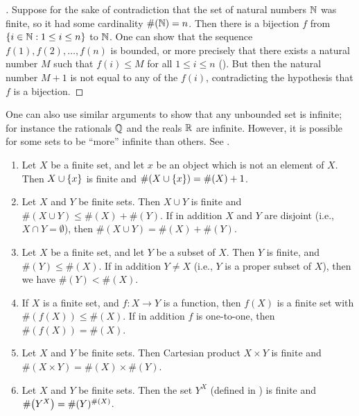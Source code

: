 \begin{proof}[]
  Suppose for the sake of contradiction that the set of natural numbers \(\mathbb{N}\) was finite, so it had some cardinality \(\#(\mathbb{N}) = n\).
  Then there is a bijection \(f\) from \(\left\lbrace i \in \mathbb{N} : 1 \leq i \leq n\right\rbrace\) to \(\mathbb{N}\).
  One can show that the sequence \(f(1), f(2), \dots, f(n)\) is bounded, or more precisely that there exists a natural number \(M\) such that \(f(i) \leq M\) for all \(1 \leq i \leq n\) ().
  But then the natural number \(M+1\) is not equal to any of the \(f(i)\), contradicting the hypothesis that \(f\) is a bijection.
\end{proof}

\begin{rmk}\label{i:3.6.13}
  One can also use similar arguments to show that any unbounded set is infinite;
  for instance the rationals \(\mathbb{Q}\) and the reals \(\mathbb{R}\) are infinite.
  However, it is possible for some sets to be ``more'' infinite than others.
  See .
\end{rmk}

\begin{prop}\label{i:3.6.14}
  \begin{enumerate}
    \item\label{i:3.6.14.a} Let \(X\) be a finite set, and let \(x\) be an object which is not an element of \(X\).
    Then \(X \cup \left\lbrace x\right\rbrace\) is finite and \(\#(X \cup \left\lbrace x\right\rbrace) = \#(X) + 1\).
    \item\label{i:3.6.14.b} Let \(X\) and \(Y\) be finite sets.
    Then \(X \cup Y\) is finite and \(\#(X \cup Y) \leq \#(X) + \#(Y)\).
    If in addition \(X\) and \(Y\) are disjoint (i.e., \(X \cap Y = \emptyset\)), then \(\#(X \cup Y) = \#(X) + \#(Y)\).
    \item\label{i:3.6.14.c} Let \(X\) be a finite set, and let \(Y\) be a subset of \(X\).
    Then \(Y\) is finite, and \(\#(Y) \leq \#(X)\).
    If in addition \(Y \neq X\) (i.e., \(Y\) is a proper subset of \(X\)), then we have \(\#(Y) < \#(X)\).
    \item\label{i:3.6.14.d} If \(X\) is a finite set, and \(f : X \to Y\) is a function, then \(f(X)\) is a finite set with \(\#(f(X)) \leq \#(X)\).
    If in addition \(f\) is one-to-one, then \(\#(f(X)) = \#(X)\).
    \item\label{i:3.6.14.e} Let \(X\) and \(Y\) be finite sets.
    Then Cartesian product \(X \times Y\) is finite and \(\#(X \times Y) = \#(X) \times \#(Y)\).
    \item\label{i:3.6.14.f} Let \(X\) and \(Y\) be finite sets.
    Then the set \(Y^X\) (defined in ) is finite and \(\#\pa{Y^X} = \#(Y)^{\#(X)}\).
  \end{enumerate}
\end{prop}

